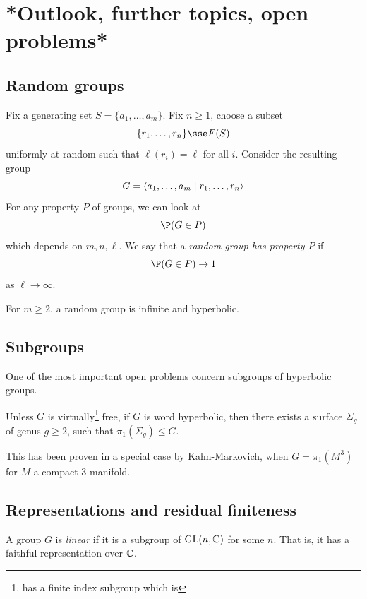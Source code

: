 \documentclass{article}
\begin{document}
\lec

\section{*Outlook, further topics, open problems*}

\subsection*{Random groups}

Fix a generating set \(S = \{a_1, \dots, a_m\}\). Fix \(n \ge 1\), choose a subset
\[\{r_1, \dots, r_n\} \sse F(S)\]
uniformly at random such that \(\ell(r_i) = \ell\) for all \(i\). Consider the resulting group
\[G = \left\langle a_1, \dots, a_m \mid r_1, \dots, r_n \right\rangle\]
For any property \(P\) of groups, we can look at
\[\P(G \in P)\]
which depends on \(m, n, \ell\). We say that a \emph{random group has property \(P\)} if
\[\P(G \in P) \to 1\]
as \(\ell \to \infty\).

\begin{theorem}

    For \(m \ge 2\), a random group is infinite and hyperbolic.
\end{theorem}

\subsection*{Subgroups}

One of the most important open problems concern subgroups of hyperbolic groups.

\begin{conjecture}
     Unless \(G\) is virtually\footnote{has a finite index subgroup which is} free, if \(G\) is word hyperbolic, then there exists a surface \(\Sigma_g\) of genus \(g \ge 2\), such that \(\pi_1(\Sigma_g) \le G\).
\end{conjecture}

This has been proven in a special case by Kahn-Markovich, when \(G = \pi_1(M^3)\) for \(M\) a compact \(3\)-manifold.

\subsection*{Representations and residual finiteness}

A group \(G\) is \emph{linear} if it is a subgroup of \(\operatorname{GL}(n, \mathbb{C})\) for some \(n\). That is, it has a faithful representation over \(\mathbb{C}\).
\end{document}
